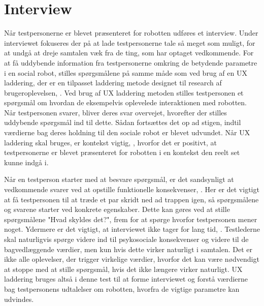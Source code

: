 \section{Interview}
\label{ParametreInterview}
%
Når testpersonerne er blevet præsenteret for robotten udføres et interview. Under interviewet fokuseres der på at lade testpersonerne tale så meget som muligt, for at undgå at dreje samtalen væk fra de ting, som har optaget vedkommende. For at få uddybende information fra testpersonerne omkring de betydende parametre i en social robot, stilles spørgsmålene på samme måde som ved brug af en UX laddering, der er en tilpasset laddering metode designet til research af brugeroplevelsen, \parencite[ss. 3-4]{PDF:LadderingUX}. Ved brug af UX laddering metoden stilles testpersonen et spørgsmål om hvordan de eksempelvis oplevelede interaktionen med robotten. Når testpersonen svarer, bliver deres svar overvejet, hvorefter der stilles uddybende spørgsmål ind til dette. Sådan fortsættes det op ad stigen, indtil værdierne bag deres holdning til den sociale robot er blevet udvundet. Når UX laddering skal bruges, er kontekst vigtig, \parencite[s. 3]{PDF:LadderingUX}, hvorfor det er positivt, at testpersonerne er blevet præsenteret for robotten i en kontekst den reelt set kunne indgå i. 

Når en testperson starter med at besvare spørgsmål, er det sandsynligt at vedkommende svarer ved at opstille funktionelle konsekvenser, \parencite[s. 3]{PDF:LadderingUX}. Her er det vigtigt at få testpersonen til at træde et par skridt ned ad trappen igen, så spørgsmålene og svarene starter ved konkrete egenskaber. Dette kan gøres ved at stille spørgsmålene "Hvad skyldes det?", frem for at spørge hvorfor testpersonen mener noget. Ydermere er det vigtigt, at interviewet ikke tager for lang tid, \parencite[s. 4]{PDF:LadderingUX}. Testlederne skal naturligvis spørge videre ind til psykosociale konsekvenser og videre til de bagvedlæggende værdier, men kun hvis dette virker naturligt i samtalen. Det er ikke alle oplevelser, der trigger virkelige værdier, hvorfor det kan være nødvendigt at stoppe med at stille spørgsmål, hvis det ikke længere virker naturligt. \blankline
%
UX laddering bruges altså i denne test til at forme interviewet og forstå værdierne bag testpersonens udtalelser om robotten, hvorfra de vigtige parametre kan udvindes.

